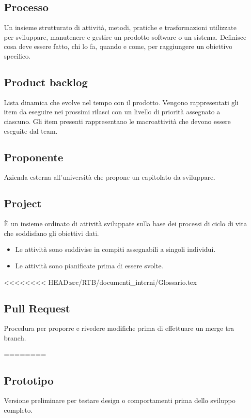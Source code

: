 \documentclass[a4paper,12pt]{article}
\begin{document}
\subsection*{Processo}
Un insieme strutturato di attività, metodi, pratiche e trasformazioni utilizzate per sviluppare, manutenere e gestire un prodotto software o un sistema. Definisce cosa deve essere fatto, chi lo fa, quando e come, per raggiungere un obiettivo specifico.

\subsection*{Product backlog}
Lista dinamica che evolve nel tempo con il prodotto. Vengono rappresentati gli item da eseguire nei prossimi rilasci con un livello di priorità assegnato a ciascuno.
Gli item presenti rappresentano le macroattività che devono essere eseguite dal team.

\subsection*{Proponente}
Azienda esterna all'università che propone un capitolato da sviluppare. 

\subsection*{Project}
È un insieme ordinato di attività sviluppate sulla base dei processi di ciclo di vita che soddisfano gli obiettivi dati.
\begin{itemize}
\item Le attività sono suddivise in compiti assegnabili a singoli individui.
\item Le attività sono pianificate prima di essere svolte.
\end{itemize}

<<<<<<<< HEAD:src/RTB/documenti_interni/Glossario.tex
\subsection*{Pull Request}
Procedura per proporre e rivedere modifiche prima di effettuare un merge tra branch.

\clearpage
========
\subsection{Prototipo}
Versione preliminare per testare design o comportamenti prima dello sviluppo completo.
\end{document}
